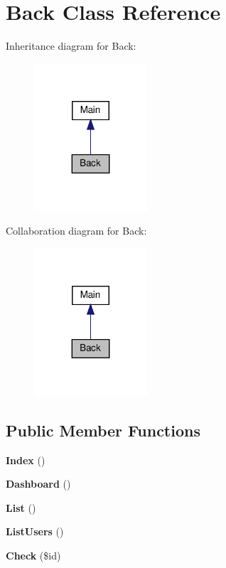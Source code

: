 \section{Back Class Reference}
\label{class_src_1_1_controllers_1_1_back}


Inheritance diagram for Back\+:
\nopagebreak
\begin{figure}[H]
\begin{center}
\leavevmode
\includegraphics[width=119pt]{class_src_1_1_controllers_1_1_back__inherit__graph}
\end{center}
\end{figure}


Collaboration diagram for Back\+:
\nopagebreak
\begin{figure}[H]
\begin{center}
\leavevmode
\includegraphics[width=119pt]{class_src_1_1_controllers_1_1_back__coll__graph}
\end{center}
\end{figure}
\subsection*{Public Member Functions}
\begin{DoxyCompactItemize}
\item 
\textbf{ Index} ()
\item 
\textbf{ Dashboard} ()
\item 
\textbf{ List} ()
\item 
\textbf{ List\+Users} ()
\item 
\textbf{ Check} (\$id)
\end{DoxyCompactItemize}
